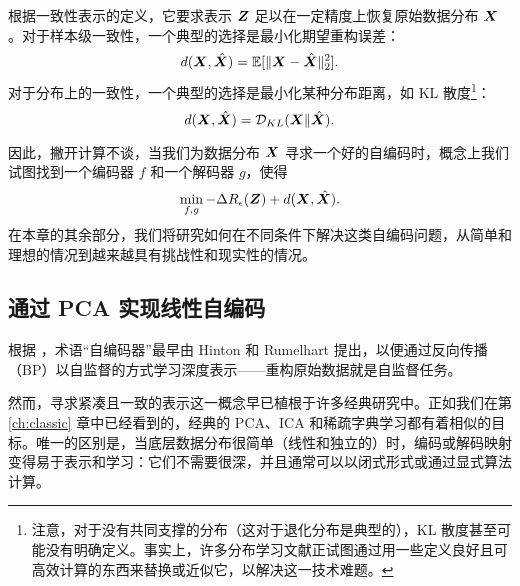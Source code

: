 \documentclass[../../book-main_zh.tex]{subfiles}
\begin{document}
根据一致性表示的定义，它要求表示 $\bm{Z}$ 足以在一定精度上恢复原始数据分布 $\bm{X}$。对于样本级一致性，一个典型的选择是最小化期望重构误差：
\begin{equation}
  d(\bm{X}, \hat {\bm{X}}) = \mathbb{E}[\|\bm{X} - \hat{\bm{X}}\|_2^2].
\end{equation}
对于分布上的一致性，一个典型的选择是最小化某种分布距离，如 KL 散度\footnote{注意，对于没有共同支撑的分布（这对于退化分布是典型的），KL 散度甚至可能没有明确定义。事实上，许多分布学习文献正试图通过用一些定义良好且可高效计算的东西来替换或近似它，以解决这一技术难题。}：
\begin{equation}
  d(\bm{X}, \hat {\bm{X}}) = \mathcal{D}_{KL}(\bm{X}\|\hat{\bm{X}}).
\end{equation}

因此，撇开计算不谈，当我们为数据分布 $\bm{X}$ 寻求一个好的自编码时，概念上我们试图找到一个编码器 $f$ 和一个解码器 $g$，使得
\begin{equation}
  \min_{f, g} - \Delta R_{\epsilon}(\bm{Z}) + d(\bm{X}, \hat {\bm{X}}).
  \label{eqn:autoencode-objective-ch5}
\end{equation}
在本章的其余部分，我们将研究如何在不同条件下解决这类自编码问题，从简单和理想的情况到越来越具有挑战性和现实性的情况。


\subsection{通过 PCA 实现线性自编码}
根据 \cite{Baldi2011}，术语“自编码器”最早由 Hinton 和 Rumelhart \cite{Rumelhart1986} 提出，以便通过反向传播（BP）以自监督的方式学习深度表示——重构原始数据就是自监督任务。

然而，寻求紧凑且一致的表示这一概念早已植根于许多经典研究中。正如我们在第 \ref{ch:classic} 章中已经看到的，经典的 PCA、ICA 和稀疏字典学习都有着相似的目标。唯一的区别是，当底层数据分布很简单（线性和独立的）时，编码或解码映射变得易于表示和学习：它们不需要很深，并且通常可以以闭式形式或通过显式算法计算。
\end{document}
